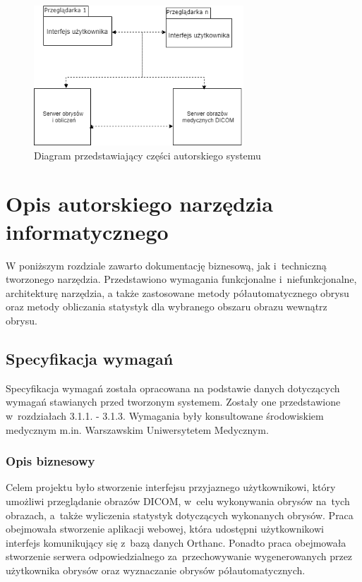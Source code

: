 \documentclass[a4paper,11pt,twoside,openright]{report}
\newcommand\blankpage{%
    \null
    \thispagestyle{empty}%
    \newpage}
\theoremstyle{definition}
\begin{document}
\begin{figure}[tb]
	\center
	\includegraphics[width=0.7\textwidth]{architektura2}
	\caption{Diagram przedstawiający części autorskiego systemu}
    	\label{fig:architektura2} %
\end{figure}

\afterpage{\blankpage}

\chapter {Opis autorskiego narzędzia informatycznego}

W poniższym rozdziale zawarto dokumentację biznesową, jak i~techniczną tworzonego narzędzia.
Przedstawiono wymagania funkcjonalne i~niefunkcjonalne,
architekturę narzędzia, a także zastosowane metody półautomatycznego obrysu oraz metody obliczania
statystyk dla wybranego obszaru obrazu wewnątrz obrysu.

\section {Specyfikacja wymagań}

Specyfikacja wymagań została opracowana na podstawie danych dotyczących wymagań stawianych
przed tworzonym systemem. Zostały one przedstawione w~rozdziałach 3.1.1. - 3.1.3. Wymagania
były konsultowane %
środowiskiem medycznym m.in. Warszawskim Uniwersytetem Medycznym.

\subsection {Opis biznesowy}

Celem projektu było stworzenie interfejsu przyjaznego użytkownikowi, który umożliwi
przeglądanie obrazów DICOM, w~celu wykonywania obrysów na~tych obrazach, a~także wyliczenia
statystyk dotyczących wykonanych obrysów. Praca
obejmowała stworzenie aplikacji webowej, która udostępni użytkownikowi interfejs
komunikujący się z~bazą danych Orthanc. Ponadto praca obejmowała stworzenie serwera
odpowiedzialnego za~przechowywanie wygenerowanych przez użytkownika obrysów oraz
wyznaczanie obrysów półautomatycznych.
\end{document}
